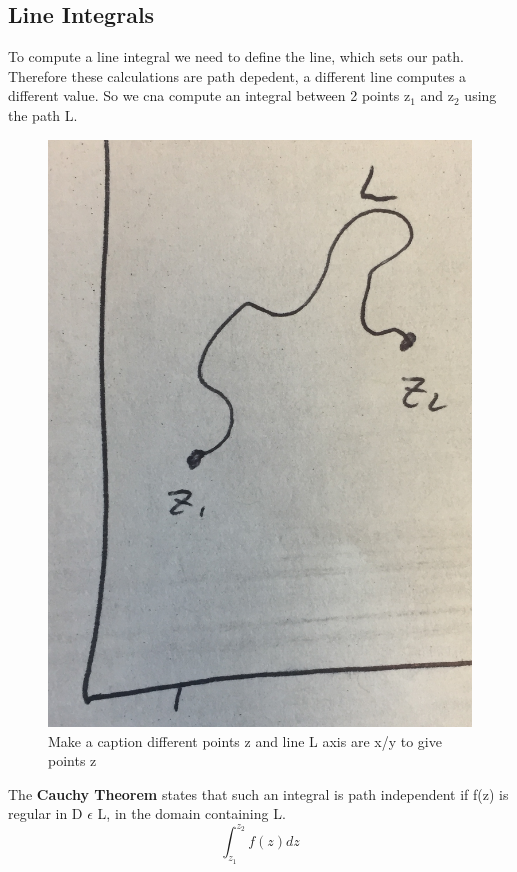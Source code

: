 \documentclass{article}
\newcommand{\be}{\begin{equation}}
\newcommand{\ee}{\end{equation}}
\begin{document}
\subsection*{Line Integrals}
To compute a line integral we need to define the line, which sets our path. 
Therefore these calculations are path depedent, a different line computes a different value. 
So we cna compute an integral between 2 points z$_1$ and z$_2$ using the path L.
\begin{figure}[h]
  \centering
  \includegraphics[scale=0.2]{Figures/line.png}
    \caption{Make a caption different points z and line L axis are x/y to give points z}
\end{figure}

The \textbf{Cauchy Theorem} states that such an integral is path independent if f(z) is regular in D $\epsilon$ L, in the domain containing L.  
\be
\int_{z_1}^{z_2} f(z) dz
\ee
\end{document}
